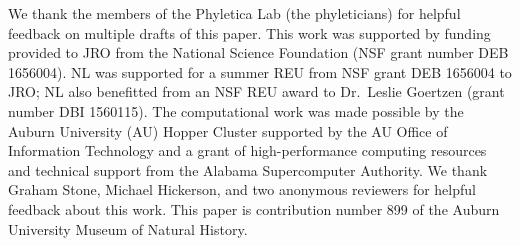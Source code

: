 We thank the members of the Phyletica Lab (the phyleticians) for helpful
feedback on multiple drafts of this paper.
This work was supported by funding provided to JRO from the National Science
Foundation (NSF grant number DEB 1656004).
NL was supported for a summer REU from NSF grant DEB 1656004 to JRO;
NL also benefitted from an NSF REU award to Dr.\ Leslie Goertzen (grant number
DBI 1560115).
The computational work was made possible by the Auburn University (AU) Hopper
Cluster supported by the AU Office of Information Technology
and
a grant of high-performance computing resources and technical support from the
Alabama Supercomputer Authority.
We thank Graham Stone, Michael Hickerson, and two anonymous reviewers for
helpful feedback about this work.
This paper is contribution number 899 of the Auburn University
Museum of Natural History.

